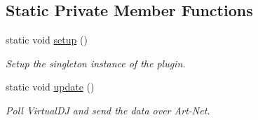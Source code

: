 \subsection*{Static Private Member Functions}
\begin{DoxyCompactItemize}
\item 
\mbox{\label{classCVDJartnet_a2bcd778bf57ec099afef11019b72edec}} 
static void \hyperlink{classCVDJartnet_a2bcd778bf57ec099afef11019b72edec}{setup} ()
\begin{DoxyCompactList}\small\item\em Setup the singleton instance of the plugin. \end{DoxyCompactList}\item 
\mbox{\label{classCVDJartnet_ad637fadb322107a12528154198157fcc}} 
static void \hyperlink{classCVDJartnet_ad637fadb322107a12528154198157fcc}{update} ()
\begin{DoxyCompactList}\small\item\em Poll Virtual\+DJ and send the data over Art-\/\+Net. \end{DoxyCompactList}\end{DoxyCompactItemize}
